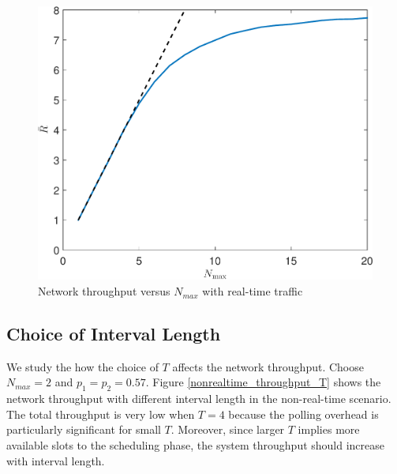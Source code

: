 \documentclass{article}
\begin{document}
\begin{figure}[htbp]
\centering
\includegraphics[scale=0.5]{realtime_throughput_randmax.pdf}
\caption{Network throughput versus $N_{max}$ with real-time traffic}
\label{realtime_throughput_randmax}
\end{figure}

\subsection{Choice of Interval Length}
We study the how the choice of $T$ affects the network throughput. Choose $N_{max}=2$ and $p_1 = p_2 = 0.57$. Figure \ref{nonrealtime_throughput_T} shows the network throughput with different interval length in the non-real-time scenario. The total throughput is very low when $T=4$ because the polling overhead is particularly significant for small $T$. Moreover, since larger $T$ implies more available slots to the scheduling phase, the system throughput should increase with interval length. 

\end{document}
